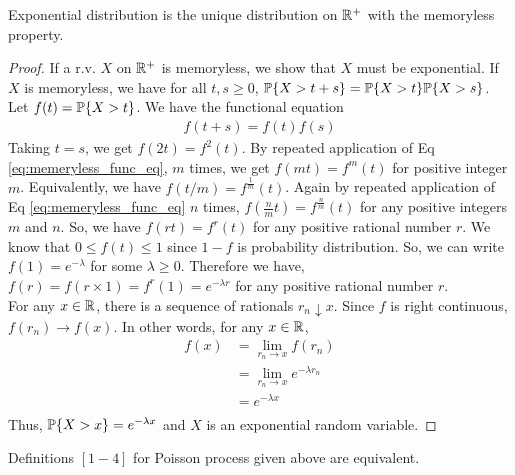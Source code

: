 \documentclass[all-lectures.tex]{subfiles}
\begin{document}
\begin{thm}[] 
Exponential distribution is the unique distribution on $\R^+$ with the memoryless property.
\begin{proof}
If a r.v. $X$ on $\R^+$ is memoryless, we show that $X$ must be exponential. If $X$ is memoryless, we have for all $t,s\geq 0$, $\P\{X>t+s\} = \P\{X>t\} \P\{X>s\}$. Let $f(t) = \P\{X>t\}$. We have the functional equation
\begin{align}
\label{eq:memeryless_func_eq}
f(t+s) = f(t) f(s)
\end{align}
Taking $t=s$, we get $f(2t) = f^2(t)$. By repeated application of Eq \ref{eq:memeryless_func_eq}, $m$ times, we get $f(mt) = f^m(t)$ for positive integer $m$. Equivalently, we have $f(t/m) =f^{\frac{1}{m}}(t)$. Again by repeated application of Eq \ref{eq:memeryless_func_eq} $n$ times, $f(\frac{n}{m}t) =f^{\frac{n}{m}}(t)$ for any positive integers $m$ and $n$. So, we have $f(rt) = f^r(t)$ for any positive rational number $r$. We know that $0\leq f(t) \leq 1$ since $1-f$ is probability distribution. So, we can write $f(1) = e^{-\lambda}$ for some $\lambda \geq 0$. Therefore we have, $f(r) = f(r \times 1) = f^r(1) = e^{-\lambda r}$ for any positive rational number $r$. \\
\indent For any $x \in \R$, there is a sequence of rationals $r_n \downarrow x$. Since $f$ is right continuous, $f(r_n) \rightarrow f(x)$. In other words, for any $x \in \R$,
\begin{align*}
f(x) &= \lim_{r_n \rightarrow x} f(r_n) \\
 &= \lim_{r_n \rightarrow x} e^{-\lambda r_n} \\
 &= e^{-\lambda x} \\ 
\end{align*}
Thus, $\P\{X>x\} = e^{-\lambda x}$ and $X$ is an exponential random variable.
\end{proof}
\end{thm}

Definitions $[1-4]$ for Poisson process given above are equivalent. 
\end{document}
